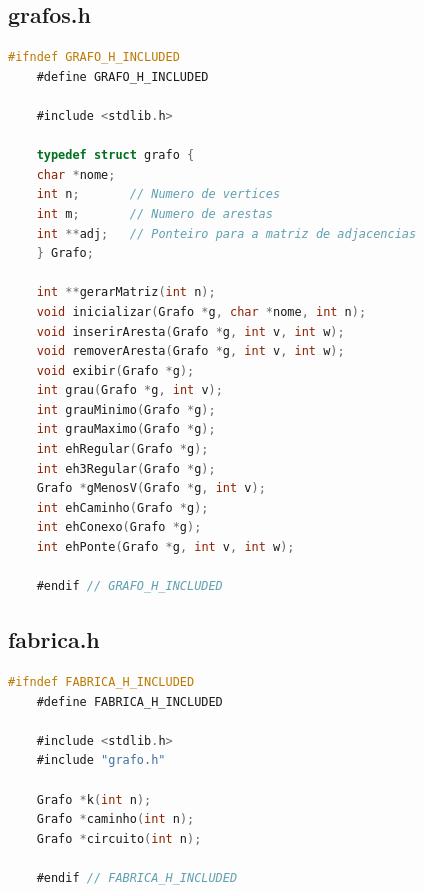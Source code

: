 \documentclass[12pt,a4paper,oneside]{article}
\begin{document}
	\subsection*{grafos.h}
	
	\begin{lstlisting}[language=C]
	#ifndef GRAFO_H_INCLUDED
	#define GRAFO_H_INCLUDED
	
	#include <stdlib.h>
	
	typedef struct grafo {
	char *nome;
	int n;       // Numero de vertices
	int m;       // Numero de arestas
	int **adj;   // Ponteiro para a matriz de adjacencias
	} Grafo;
	
	int **gerarMatriz(int n);
	void inicializar(Grafo *g, char *nome, int n);
	void inserirAresta(Grafo *g, int v, int w);
	void removerAresta(Grafo *g, int v, int w);
	void exibir(Grafo *g);
	int grau(Grafo *g, int v);
	int grauMinimo(Grafo *g);
	int grauMaximo(Grafo *g);
	int ehRegular(Grafo *g);
	int eh3Regular(Grafo *g);
	Grafo *gMenosV(Grafo *g, int v);
	int ehCaminho(Grafo *g);
	int ehConexo(Grafo *g);
	int ehPonte(Grafo *g, int v, int w);
	
	#endif // GRAFO_H_INCLUDED\end{lstlisting}
	
	\newpage
	
	\subsection*{fabrica.h}
	
	\begin{lstlisting}[language=C]
	#ifndef FABRICA_H_INCLUDED
	#define FABRICA_H_INCLUDED
	
	#include <stdlib.h>
	#include "grafo.h"
	
	Grafo *k(int n);
	Grafo *caminho(int n);
	Grafo *circuito(int n);
	
	#endif // FABRICA_H_INCLUDED\end{lstlisting}
	
\end{document}
